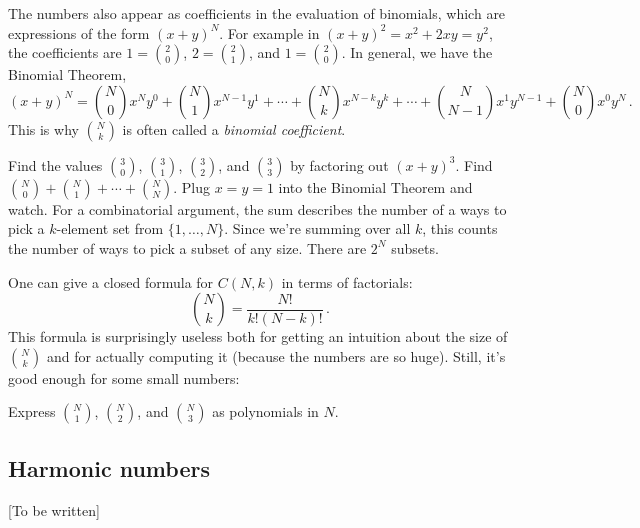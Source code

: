 \documentclass{tufte-handout}
\begin{document}
The numbers also appear as coefficients in the evaluation of
binomials, which are expressions of the form $(x+y)^N$. For example
in $(x+y)^2= x^2 + 2xy = y^2$, the coefficients are $1=\binom{2}{0}$, $2=\binom{2}{1}$, and
$1=\binom{2}{0}$. In general, we have the Binomial Theorem,
\[ (x+y)^N = \binom{N}{0} x^N y^0 +\binom{N}{1} x^{N-1}y^1+\cdots
+ \binom{N}{k} x^{N-k}y^k +\cdots+ \binom{N}{N-1} x^1y^{N-1} +
\binom{N}{0} x^0y^N\,.\] 
This is why $\binom{N}{k}$ is often called a \emph{binomial coefficient}.

\begin{ExerciseList}
  \Exercise Find the values $\binom{3}{0}$, $\binom{3}{1}$,
  $\binom{3}{2}$, and $\binom{3}{3}$ by factoring out $(x+y)^3$.
  \Exercise Find $\binom{N}{0}+\binom{N}{1}+\cdots+\binom{N}{N}$.
  \Answer Plug $x=y=1$ into the Binomial Theorem and watch. For a
  combinatorial argument, the sum describes the number of a ways to
  pick a $k$-element set from $\{1,\ldots, N\}$. Since we're summing
  over all $k$, this counts the number of ways to pick a subset of any
  size. There are $2^N$ subsets.
\end{ExerciseList}

One can give a closed formula for $C(N,k)$ in terms of factorials:
\[ \binom{N}{k}= \frac{N!}{k!(N-k)!}\,. \] 
This formula is surprisingly
useless both for getting an intuition about the size of $\binom{N}{k}$ and
for actually computing it (because the numbers are so huge).
Still, it's good enough for some small numbers:

\begin{ExerciseList}
  \Exercise Express $\binom{N}{1}$, $\binom{N}{2}$, and
  $\binom{N}{3}$ as polynomials in $N$.
\end{ExerciseList}

\subsection{Harmonic numbers}

[To be written]
\end{document}
